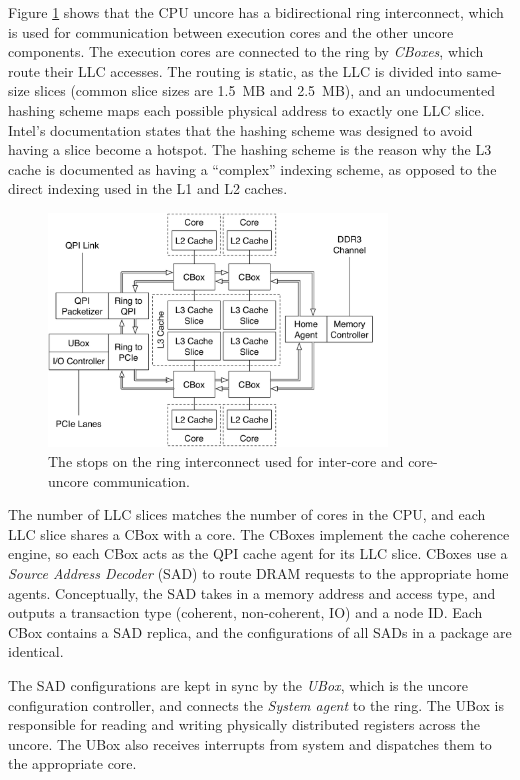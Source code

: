
Figure \ref{fig:cpu_uncore} shows that the CPU uncore has a bidirectional ring
interconnect, which is used for communication between execution cores and the
other uncore components. The execution cores are connected to the ring by
\textit{CBoxes}, which route their LLC accesses. The routing is static, as the
LLC is divided into same-size slices (common slice sizes are 1.5~MB and
2.5~MB), and an undocumented hashing scheme maps each possible physical address
to exactly one LLC slice. Intel's documentation states that the hashing scheme
was designed to avoid having a slice become a hotspot. The hashing scheme is
the reason why the L3 cache is documented as having a ``complex'' indexing
scheme, as opposed to the direct indexing used in the L1 and L2 caches.

\begin{figure}[hbt]
  \centering
  \includegraphics[width=90mm]{figures/cpu_uncore.pdf}
  \caption{
    The stops on the ring interconnect used for inter-core and core-uncore
    communication.
  }
  \label{fig:cpu_uncore}
\end{figure}

The number of LLC slices matches the number of cores in the CPU, and each LLC
slice shares a CBox with a core. The CBoxes implement the cache coherence
engine, so each CBox acts as the QPI cache agent for its LLC slice. CBoxes
use a \textit{Source Address Decoder} (SAD) to route DRAM requests to the
appropriate home agents. Conceptually, the SAD takes in a memory address and
access type, and outputs a transaction type (coherent, non-coherent, IO) and a
node ID. Each CBox contains a SAD replica, and the configurations of all SADs
in a package are identical.

The SAD configurations are kept in sync by the \textit{UBox}, which is the
uncore configuration controller, and connects the \textit{System agent} to the
ring. The UBox is responsible for reading and writing physically distributed
registers across the uncore. The UBox also receives interrupts from system and
dispatches them to the appropriate core.

